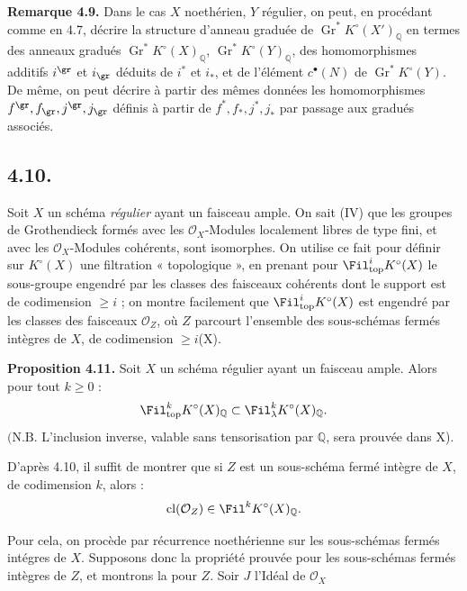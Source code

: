 \textbf{Remarque 4.9.} Dans le cas \(X\) noethérien, \(Y\) régulier, on peut, en procédant comme en 4.7, décrire la structure d'anneau graduée de \(\operatorname{Gr}^*K^\circ(X')_{\mathbb Q}\) en termes des anneaux gradués \(\operatorname{Gr}^*K^\circ(X)_{\mathbb Q}\), \(\operatorname{Gr}^*K^\circ(Y)_{\mathbb Q}\), des homomorphismes additifs \(i^{\gr}\) et \(i_{\gr}\) déduits de \(i^*\) et \(i_*\), et de l'élément \(c^{\bullet}(N)\) de \(\operatorname{Gr}^*K^\circ(Y)\). De même, on peut décrire à partir des mêmes données les homomorphismes \(f^{\gr},f_{\gr},j^{\gr},j_{\gr}\) définis à partir de \(f^*,f_*,j^*,j_*\) par passage aux gradués associés.

\subsection*{4.10.}

Soit \(X\) un schéma \emph{régulier} ayant un faisceau ample. On sait (IV\qquad) que les groupes de Grothendieck formés avec les \(\mathcal O_X\)-Modules localement libres de type fini, et avec les \(\mathcal O_X\)-Modules cohérents, sont isomorphes. On utilise ce fait pour définir sur \(K^\circ(X)\) une filtration « topologique », en prenant pour \(\Fil^i_{\mathrm{top}}K^\circ(X)\) le sous-groupe engendré par les classes des faisceaux cohérents dont le support est de codimension \(\ge i\) ; on montre facilement que \(\Fil^i_{\mathrm{top}}K^\circ(X)\) est engendré par les classes des faisceaux \(\mathcal O_Z\), où \(Z\) parcourt l'ensemble des sous-schémas fermés intègres de \(X\), de codimension \(\ge i\)(X\qquad).

\textbf{Proposition 4.11.} Soit \(X\) un schéma régulier ayant un faisceau ample. Alors pour tout \(k\ge0\) :
\[
  \Fil_{\mathrm{top}}^kK^\circ(X)_{\mathbb Q}
  \subset
  \Fil_\lambda^kK^\circ(X)_{\mathbb Q}.
\]
\((\mathrm{N.B.}\) L'inclusion inverse, valable sans tensorisation par \(\mathbb Q\), sera prouvée dans X\qquad).

D'après 4.10, il suffit de montrer que si \(Z\) est un sous-schéma fermé intègre de \(X\), de codimension \(k\), alors :
\[
  \operatorname{cl}(\mathcal O_Z)\in\Fil^kK^\circ(X)_{\mathbb Q}.
\]

Pour cela, on procède par récurrence noethérienne sur les sous-schémas fermés intégres de \(X\). Supposons donc la propriété prouvée pour les sous-schémas fermés intègres de \(Z\), et montrons la pour \(Z\). Soir \(J\) l'Idéal de \(\mathcal O_X\)
